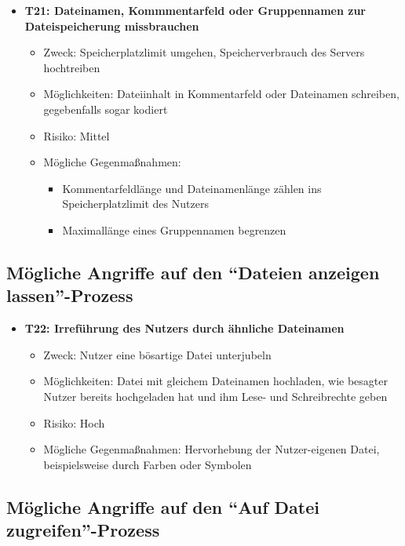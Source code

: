 \documentclass[12pt,DIV14,BCOR10mm,a4paper,parskip=half-,headsepline,headinclude,english,ngerman,bibliography=totocnumbered]{scrreprt}
\begin{document}
\begin{itemize}
  \hypertarget{threat21}{}
  \item \textbf{T21: Dateinamen, Kommmentarfeld oder Gruppennamen zur Dateispeicherung missbrauchen}
  \begin{itemize}
  \item Zweck: Speicherplatzlimit umgehen, Speicherverbrauch des Servers hochtreiben
  \item Möglichkeiten: Dateiinhalt in Kommentarfeld oder Dateinamen schreiben, gegebenfalls sogar kodiert
  \item Risiko: Mittel
  \item Mögliche Gegenmaßnahmen:
  \begin{itemize}
    \item Kommentarfeldlänge und Dateinamenlänge zählen ins Speicherplatzlimit des Nutzers
    \item Maximallänge eines Gruppennamen begrenzen
  \end{itemize}
  \end{itemize}
\end{itemize}

\subsection{Mögliche Angriffe auf den \enquote{Dateien anzeigen lassen}-Prozess}

\begin{itemize}
  \hypertarget{threat22}{}
  \item \textbf{T22: Irreführung des Nutzers durch ähnliche Dateinamen}
  \begin{itemize}
  \item Zweck: Nutzer eine bösartige Datei unterjubeln
  \item Möglichkeiten: Datei mit gleichem Dateinamen hochladen, wie besagter Nutzer bereits hochgeladen hat und ihm Lese- und Schreibrechte geben
  \item Risiko: Hoch
  \item Mögliche Gegenmaßnahmen: Hervorhebung der Nutzer-eigenen Datei, beispielsweise durch Farben oder Symbolen
  \end{itemize}
\end{itemize}

\subsection{Mögliche Angriffe auf den \enquote{Auf Datei zugreifen}-Prozess}
\end{document}
